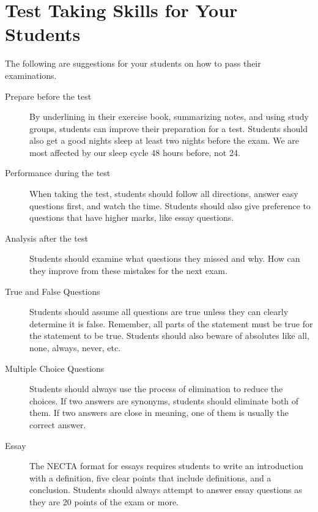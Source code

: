 \section{Test Taking Skills for Your Students}
The following are suggestions for your students on how to pass their examinations.
\begin{description}
\item[Prepare before the test] By underlining in their exercise book, summarizing notes, and using study groups, students can improve their preparation for a test. Students should also get a good nights sleep at least two nights before the exam.  We are most affected by our sleep cycle 48 hours before, not 24.
\item[Performance during the test] When taking the test, students should follow all directions, answer easy questions first, and watch the time. Students should also give preference to questions that have higher marks, like essay questions. 
\item[Analysis after the test] Students should examine what questions they missed and why.  How can they improve from these mistakes for the next exam.
\item[True and False Questions] Students should assume all questions are true unless they can clearly determine it is false. Remember, all parts of the statement must be true for the statement to be true. Students should also beware of absolutes like all, none, always, never, etc. 
\item[Multiple Choice Questions] Students should always use the process of elimination to reduce the choices. If two answers are synonyms, students should eliminate both of them. If two answers are close in meaning, one of them is usually the correct answer.
\item[Essay] The NECTA format for essays requires students to write an introduction with a definition, five clear points that include definitions, and a conclusion. Students should always attempt to answer essay questions as they are 20 points of the exam or more.
\end{description}

